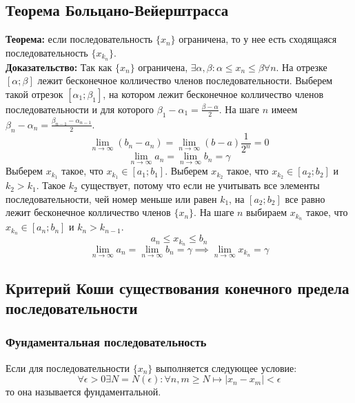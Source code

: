\documentclass{article}
\begin{document}
    \subsection*{Теорема Больцано-Вейерштрасса}
        \textbf{Теорема:} если последовательность $\{x_n\}$ ограничена, то у нее есть сходящаяся последовательность $\{x_{k_n}\}$.
        \\
        \textbf{Доказательство:}
        Так как $\{x_n\}$ ограничена, $\exists \alpha, \beta: \alpha \le x_n \le \beta \forall n$.
        На отрезке $[\alpha; \beta]$ лежит бесконечное колличество членов последовательности.
        Выберем такой отрезок $[\alpha_1; \beta_1]$, на котором лежит бесконечное колличество членов последовательности
        и для которого $\beta_1 - \alpha_1 = \frac{\beta - \alpha}{2}$.
        На шаге $n$ имеем $\beta_n - \alpha_n = \frac{\beta_{n-1} - \alpha_{n-1}}{2}$.
        \[ \lim_{n\to\infty} (b_n - a_n) = \lim_{n\to\infty} (b - a)\frac{1}{2^n} = 0 \]
        \[ \lim_{n\to\infty} a_n = \lim_{n\to\infty} b_n = \gamma \]
        Выберем $x_{k_1}$ такое, что $x_{k_1} \in [a_1;b_1]$.
        Выберем $x_{k_2}$ такое, что $x_{k_2} \in [a_2;b_2]$ и $k_2 > k_1$. Такое $k_2$ существует, потому что если не учитывать все элементы
        последовательности, чей номер меньше или равен $k_1$, на $[a_2;b_2]$ все равно лежит бесконечное колличество членов $\{x_n\}$.
        На шаге $n$ выбираем $x_{k_n}$ такое, что $x_{k_n} \in [a_n;b_n]$ и $k_n > k_{n-1}$.
        \[ a_n \le x_{k_n} \le b_n \]
        \[ \lim_{n\to\infty} a_n = \lim_{n\to\infty} b_n = \gamma \implies \lim_{n\to\infty} x_{k_n} = \gamma \]
        
    
    \subsection*{Критерий Коши существования конечного предела последовательности}
        \subsubsection*{Фундаментальная последовательность}
        Если для последовательности $\{x_n\}$ выполняется следующее условие:
        \[ \forall \epsilon > 0 \exists N = N(\epsilon): \forall n,m \ge N \longmapsto |x_n - x_m| < \epsilon \]
        то она называется фундаментальной.
        
\end{document}
